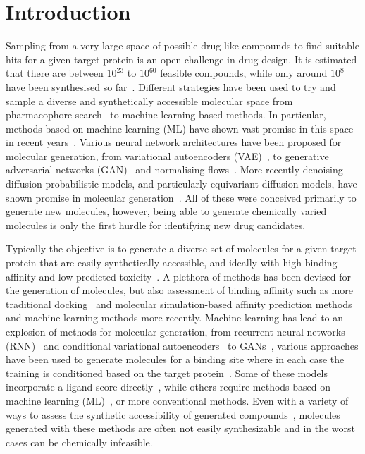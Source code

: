 \documentclass[journal=jacsat,manuscript=article]{achemso}
\begin{document}
\section{Introduction}
\label{sec:intro}
Sampling from a very large space of possible drug-like compounds to find suitable hits for a given target protein is an open challenge in drug-design. It is estimated that there are between $10^{23}$ to $10^{60}$ feasible compounds, while only around $10^8$ have been synthesised so far~\cite{polishchuk2013estimation, reymond2012exploring}. Different strategies have been used   to try and sample a diverse and synthetically accessible molecular space from pharmacophore search~\cite{schwab2010conformations} to machine learning-based methods. In particular, methods based on machine learning (ML) have shown vast promise in this space in recent years~\cite{bilodeau2022generative}. Various neural network architectures have been proposed for molecular generation, from variational autoencoders (VAE)~\cite{kingma2022autoencoding, jin2018junction, ma2018constrained, ragoza2022generating}, to generative adversarial networks (GAN)~\cite{hoffmann2019generating} and normalising flows~\cite{shi2021learning}. More recently denoising diffusion probabilistic models, and particularly equivariant diffusion models, have shown promise in molecular generation~\cite{xu2022geodiff, hoogeboom2022equivariant}. All of these were conceived primarily to generate new molecules, however, being able to generate chemically varied molecules is only the first hurdle for identifying new drug candidates.

Typically the objective is to generate a diverse set of molecules for a given target protein that are easily synthetically accessible, and ideally with high binding affinity and low predicted toxicity~\cite{prieto-martinez2019chapter}. A plethora of methods has been devised for the generation of molecules, but also assessment of binding affinity such as more traditional docking~\cite{fu2018predictive} and molecular simulation-based affinity prediction methods~\cite{mey2016blinded,mey2020best} and machine learning methods more recently. Machine learning has lead to an explosion of methods for molecular generation, from recurrent neural networks (RNN)~\cite{xu2021novo,zhang2022novo} and conditional variational autoencoders~\cite{ragoza2022generating} to GANs~\cite{skalic2019target}, various approaches have been used to generate molecules for a binding site where in each case the training is conditioned based on the target protein~\cite{xie2022advances}. Some of these models incorporate a ligand score directly~\cite{ragoza2022generating}, while others require methods based on machine learning (ML)~\cite{masters2023deep}, or more conventional methods. Even with a variety of ways to assess the synthetic accessibility of generated compounds~\cite{coley2018scscore, thakkar2021retrosynthetic}, molecules generated with these methods are often not easily synthesizable and in the worst cases can be chemically infeasible. 
\end{document}
